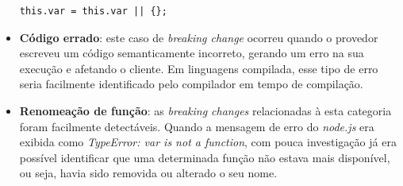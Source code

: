 \begin{itemize}
    \begin{lstlisting}[style=bash, label=cod:undefined_object]
    this.var = this.var || {};
    \end{lstlisting}



    \item \textbf{Código errado}: este caso de \textit{breaking change} ocorreu quando o provedor escreveu um código semanticamente incorreto, gerando um erro na sua execução e afetando o cliente. Em linguagens compilada, esse tipo de erro seria facilmente identificado pelo compilador em tempo de compilação. %


    \item \textbf{Renomeação de função}: as \textit{breaking changes} relacionadas à esta categoria foram facilmente detectáveis. Quando a mensagem de erro do \textit{node.js} era exibida como \textit{TypeError: var is not a function}, com pouca investigação já era possível identificar que uma determinada função não estava mais disponível, ou seja, havia sido removida ou alterado o seu nome.



\end{itemize}
